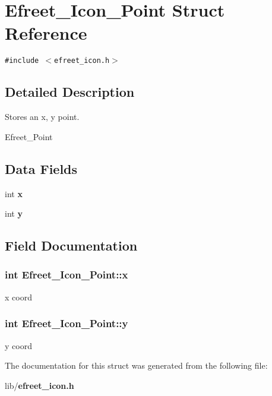 \section{Efreet\_\-Icon\_\-Point Struct Reference}
\label{structEfreet__Icon__Point}
{\tt \#include $<$efreet\_\-icon.h$>$}



\subsection{Detailed Description}
Stores an x, y point. 

Efreet\_\-Point \subsection*{Data Fields}
\begin{CompactItemize}
\item 
int {\bf x}
\item 
int {\bf y}
\end{CompactItemize}


\subsection{Field Documentation}
\subsubsection[x]{\setlength{\rightskip}{0pt plus 5cm}int {\bf Efreet\_\-Icon\_\-Point::x}}\label{structEfreet__Icon__Point_02bfe9ca93c1e5054b088e5a4602ebd1}


x coord 
\subsubsection[y]{\setlength{\rightskip}{0pt plus 5cm}int {\bf Efreet\_\-Icon\_\-Point::y}}\label{structEfreet__Icon__Point_65c92e8c345949367750c7bd5b436671}


y coord 

The documentation for this struct was generated from the following file:\begin{CompactItemize}
\item 
lib/{\bf efreet\_\-icon.h}\end{CompactItemize}
